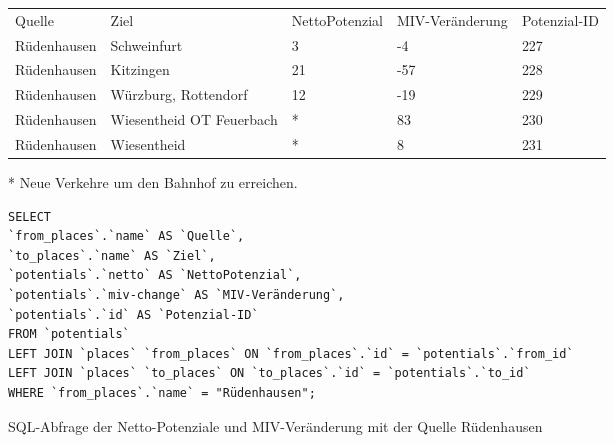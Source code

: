\begin{tabular}{ l  l  l  l  l }
Quelle & Ziel & NettoPotenzial & MIV-Veränderung & Potenzial-ID\\ 
Rüdenhausen & Schweinfurt & 3 & -4 & 227\\ 
Rüdenhausen & Kitzingen & 21 & -57 & 228\\ 
Rüdenhausen & Würzburg, Rottendorf & 12 & -19 & 229\\ 
Rüdenhausen & Wiesentheid OT Feuerbach & * & 83 & 230\\ 
Rüdenhausen & Wiesentheid & * & 8 & 231\\ 
\end{tabular}
\newline
\newline
* Neue Verkehre um den Bahnhof zu erreichen.
\newline
\begin{listing}[htbp]
\begin{verbatim}
SELECT
`from_places`.`name` AS `Quelle`, 
`to_places`.`name` AS `Ziel`, 
`potentials`.`netto` AS `NettoPotenzial`, 
`potentials`.`miv-change` AS `MIV-Veränderung`, 
`potentials`.`id` AS `Potenzial-ID`
FROM `potentials`
LEFT JOIN `places` `from_places` ON `from_places`.`id` = `potentials`.`from_id`
LEFT JOIN `places` `to_places` ON `to_places`.`id` = `potentials`.`to_id`
WHERE `from_places`.`name` = "Rüdenhausen";
\end{verbatim}
\caption{SQL-Abfrage der Netto-Potenziale und MIV-Veränderung mit der Quelle Rüdenhausen}\label{lst-fz-ruedenhausen}
\end{listing}